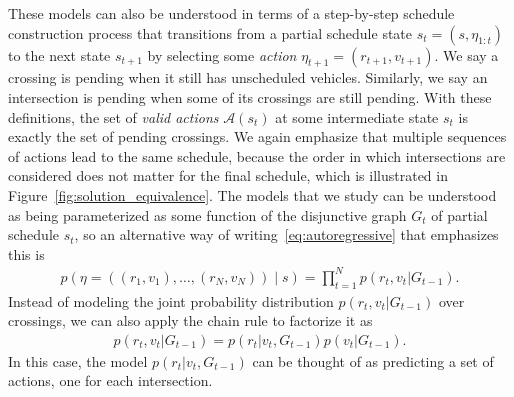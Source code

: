 \documentclass[a4paper]{article}
\theoremstyle{definition}
\theoremstyle{plain}
\begin{document}
These models can also be understood in terms of a step-by-step schedule
construction process that transitions from a partial schedule state
$s_{t} = (s, \eta_{1:t})$ to the next state $s_{t+1}$ by selecting some \textit{action}
$\eta_{t+1} = (r_{t+1}, v_{t+1})$. We say a crossing is pending when it still has
unscheduled vehicles. Similarly, we say an intersection is pending when some of
its crossings are still pending. With these definitions, the set of \textit{valid actions}
$\mathcal{A}(s_{t})$ at some intermediate state $s_{t}$ is exactly the set of
pending crossings.
%
We again emphasize that multiple sequences of actions lead to the same schedule,
because the order in which intersections are considered does not matter for the
final schedule, which is illustrated in Figure~\ref{fig:solution_equivalence}.
%
The models that we study can be understood as being parameterized as some
function of the disjunctive graph $G_{t}$ of partial schedule $s_{t}$, so an
alternative way of writing~\eqref{eq:autoregressive} that emphasizes this is
\begin{align}
  p(\eta = ((r_{1}, v_{1}), \dots, (r_{N}, v_{N})) \; | \; s) = \prod_{t=1}^{N} p(r_{t}, v_{t} | G_{t-1}) .
\end{align}
%
Instead of modeling the joint
probability distribution $p(r_{t}, v_{t} | G_{t-1})$ over crossings, we can also apply
the chain rule to factorize it as
\begin{align}
  p(r_{t}, v_{t} | G_{t-1}) = p(r_{t} | v_{t} , G_{t-1}) p (v_{t} | G_{t-1}) .
\end{align}
In this case, the model $p(r_{t} | v_{t}, G_{t-1})$ can be thought of as
predicting a set of actions, one for each intersection.
\end{document}
